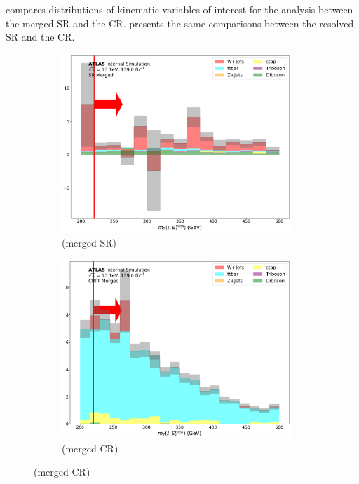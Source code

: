 \Fig{~\ref{fig:N_1_CRTT_merged}} compares distributions of kinematic variables of interest for the analysis between the merged SR and the \ttbar CR. \Fig{~\ref{fig:N_1_CRTT_resolved}} presents the same comparisons between the resolved SR and the \ttbar CR.

\begin{figure}[htbp]
  \centering
     \begin{subfigure}{0.45\textwidth}
     \includegraphics[width = 0.95\textwidth]{Figures/App_SR_CR_distributions/SR1L_Merged/mT_lep_met_N_1.pdf}
    \caption{\mtlepmet (merged SR)}
     \end{subfigure}
    \begin{subfigure}{0.45\textwidth}
     \includegraphics[width = 0.95\textwidth]{Figures/App_SR_CR_distributions/CRTT_Merged/mT_lep_met_N_1.pdf}
     \caption{\mtlepmet (merged \ttbar CR)}
     \end{subfigure}


\end{figure}
